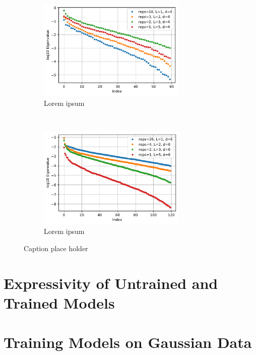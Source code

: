 \begin{figure}[H]
    \centering
    \begin{subfigure}[t]{0.5\textwidth}
        \centering
        \includegraphics[height=1.9in]{latex/figures/FIM_qubits_4_comparison.pdf}
        \caption{Lorem ipsum}
        \label{fig:FIM QCN a}
    \end{subfigure}%
    ~ 
    \begin{subfigure}[t]{0.5\textwidth}
        \centering
        \includegraphics[height=1.9in]{latex/figures/FIM_qubits_6_comparison.pdf}
        \caption{Lorem ipsum}
        \label{fig:FIM QCN b}
    \end{subfigure}
    \caption{Caption place holder}
    \label{fig:FIM QCN}
\end{figure}


\section{Expressivity of Untrained and Trained Models}\label{sec:Expressivity of Untrained and Trained Models}


\section{Training Models on Gaussian Data}\label{sec:Training Models on Gaussian Data}

